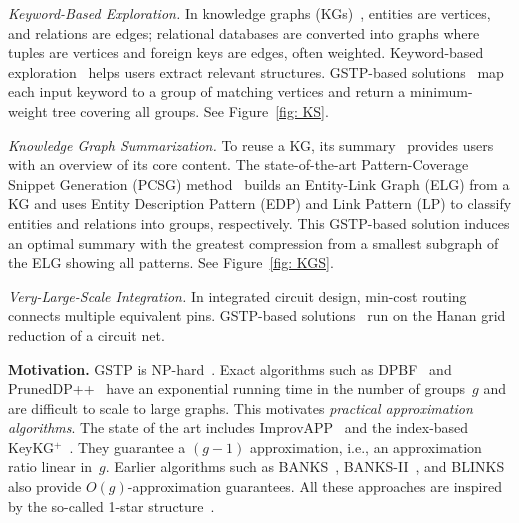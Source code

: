 \textit{Keyword-Based Exploration.} In knowledge graphs (KGs)~\cite{KG_D}, entities are vertices, and relations are edges; relational databases are converted into graphs where tuples are vertices and foreign keys are edges, often weighted. Keyword-based exploration~\cite{KS_3,KS_1} helps users extract relevant structures. GSTP-based solutions~\cite{KS_6, KS_7, KS_5} map each input keyword to a group of matching vertices and return a minimum-weight tree covering all groups. See Figure~\ref{fig: KS}.

\textit{Knowledge Graph Summarization.} To reuse a KG, its summary~\cite{KS_3, KGS_3} provides users with an overview of its core content. The state-of-the-art Pattern-Coverage Snippet Generation (PCSG) method~\cite{KGS_1} builds an Entity-Link Graph (ELG) from a KG and uses Entity Description Pattern (EDP) and Link Pattern (LP) to classify entities and relations into groups, respectively. This GSTP-based solution induces an optimal summary with the greatest compression from a smallest subgraph of the ELG showing all patterns. See Figure~\ref{fig: KGS}.

\textit{Very-Large-Scale Integration.} In integrated circuit design, min-cost routing~\cite{VLSI_3} connects multiple equivalent pins. GSTP-based solutions~\cite{VLSI_1, VLSI_2} run on the Hanan grid reduction of a circuit net.


\textbf{Motivation.} GSTP is NP-hard~\cite{ProveNP}. Exact algorithms such as DPBF~\cite{KS_5} and PrunedDP++~\cite{PrunedDP} have an exponential running time in the number of groups~$g$ and are difficult to scale to large graphs. This motivates \emph{practical approximation algorithms}. The state of the art includes ImprovAPP~\cite{ImprovAPP} and the index-based KeyKG$^+$~\cite{KeyKG}.
They guarantee a $(g-1)$ approximation, i.e., an approximation ratio linear in~$g$. Earlier algorithms such as BANKS~\cite{BANKS}, BANKS-II~\cite{BANKS2}, and BLINKS~\cite{BLINKS} also provide $O(g)$-approximation guarantees.
All these approaches are inspired by the so-called 1-star structure~\cite{gsub1_source}.

